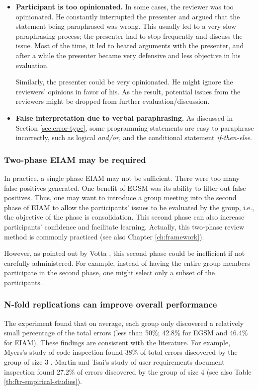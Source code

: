 \begin{itemize}
\item {\bf Participant is too opinionated.}
In some cases, the reviewer was too opinionated. He constantly
interrupted the presenter and argued that the statement being
paraphrased was wrong.  
This usually led to a very slow paraphrasing process; the presenter had to
stop frequently and discuss the issue. Most of the time, 
it led to heated arguments with the presenter, and after a
while the presenter became very defensive and less objective in his
evaluation. 

Similarly, the presenter could be very opinionated. He might
ignore the reviewers' opinions in favor of his. 
As the result, potential issues from the reviewers
might be dropped from further evaluation/discussion.

\item {\bf False interpretation due to verbal paraphrasing.}
As discussed in Section \ref{sec:error-type}, some programming statements
are easy to paraphrase incorrectly, such as logical {\it and/or}, and 
the conditional statement {\it if-then-else}.

\end{itemize}


\subsubsection{Two-phase EIAM may be required}
\label{sec:two-phase}
In practice, a single phase EIAM may not be sufficient. There 
were too many false positives generated. One benefit of EGSM 
was its ability to filter out false positives. Thus, one may want to
introduce a group meeting into the second phase of EIAM to allow
the participants' issues to be  evaluated by the group, i.e., the
objective of the phase is consolidation.
This second phase can also increase participants'
confidence and facilitate learning.
Actually, this two-phase review method is commonly
practiced \cite{Humphrey90,Votta93,Porter94} (see also Chapter
\ref{ch:framework}). 

However, as pointed out by Votta \cite{Votta93}, this second phase could
be inefficient if not carefully administered. For example, instead of
having the entire group members participate in the second phase,
one might select only a subset of the participants.

\subsubsection{N-fold replications can improve overall performance}
\label{sec:n-fold-inspection}
The experiment found that on average,  each group only discovered
a relatively small percentage of the total errors (less than 50\%;
42.8\% for EGSM and 46.4\% for EIAM). These findings are consistent
with the  literature. For example, Myers's
study of code inspection found 38\% of total errors discovered by the
group of size 3 \cite{Myers78}. Martin and Tsai's study of 
user requirements document inspection found 
27.2\% of errors discovered by the group of size 4 \cite{Martin90}
(see also Table \ref{tb:ftr-empirical-studies}).


